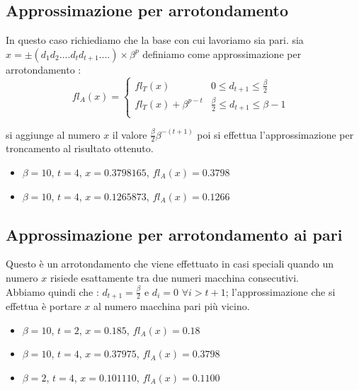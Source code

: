 \documentclass[12pt, a4paper]{book}
\theoremstyle{definition}
\begin{document}
\subsection{Approssimazione per arrotondamento}
\begin{flushleft}
In questo caso richiediamo che la base con cui lavoriamo sia pari.
sia $x = \pm(d_{1}d_{2}....d_{t}d_{t+1}....)\times \beta^{p}$ definiamo come approssimazione per arrotondamento :
\[
fl_{A}(x) = 
\begin{cases}
  fl_{T}(x) & \text{$0 \leq d_{t+1} \leq \frac{\beta}{2}$ } \\
  fl_{T}(x) + \beta^{p-t} & \text{$\frac{\beta}{2} \leq d_{t+1} \leq \beta - 1$ } \\
\end{cases}
\]

si aggiunge al numero $x$ il valore $\frac{\beta}{2}\beta^{-(t+1)}$ poi si effettua l'approssimazione per troncamento al risultato ottenuto.
\end{flushleft}

\begin{itemize}
  	\item $\beta = 10$,  $t=4$,  $x = 0.3798165$,  $fl_{A}(x) =  0.3798$
  	\item $\beta = 10$,  $t=4$,  $x = 0.1265873$,  $fl_{A}(x) =  0.1266$
\end{itemize}

\subsection{Approssimazione per arrotondamento ai pari}
\begin{flushleft}
Questo è un arrotondamento che viene effettuato in casi speciali quando un numero $x$ risiede esattamente tra due numeri macchina consecutivi.\\
Abbiamo quindi che : $d_{t+1} = \frac{\beta}{2}$ e $d_{i} = 0$ $\forall i > t + 1$; l'approssimazione che si effettua è portare $x$ al numero macchina pari più vicino.  

\begin{itemize}
  	\item $\beta = 10$,  $t=2$,  $x = 0.185 $,  $fl_{A}(x) =  0.18$
  	\item $\beta = 10$,  $t=4$,  $x = 0.37975 $,  $fl_{A}(x) =  0.3798$
  	\item $\beta = 2$,  $t=4$,  $x = 0.101110$,  $fl_{A}(x) =  0.1100$
\end{itemize}
\end{flushleft}
\newpage
\end{document}
